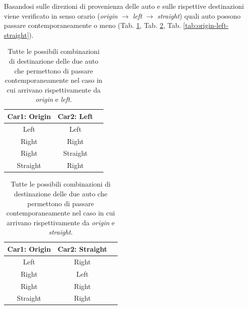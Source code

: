 Basandosi sulle direzioni di provenienza delle auto e sulle rispettive destinazioni viene verificato
in senso orario (\textit{origin} $\rightarrow$ \textit{left} $\rightarrow$ \textit{straight})
quali auto possono passare contemporaneamente o meno (Tab. \ref{tab:origin-left}, Tab. \ref{tab:origin-straight}, Tab. \ref{tab:origin-left-straight}).


\begin{table}[ht]
    \centering
    \begin{tabular}{|c|c|c|}
        \hline
        \textbf{Car1: Origin} & \textbf{Car2: Left} \\ \hline
        Left                  & Left                \\ \hline
        Right                 & Right               \\ \hline
        Right                 & Straight            \\ \hline
        Straight              & Right               \\ \hline
    \end{tabular}
    \caption{Tutte le possibili combinazioni di destinazione delle due auto che permettono
        di passare contemporaneamente nel caso in cui arrivano rispettivamente da \textit{origin} e \textit{left}.}
    \label{tab:origin-left}
\end{table}

\begin{table}[ht]
    \centering
    \begin{tabular}{|c|c|c|}
        \hline
        \textbf{Car1: Origin} & \textbf{Car2: Straight} \\ \hline
        Left                  & Right                   \\ \hline
        Right                 & Left                    \\ \hline
        Right                 & Right                   \\ \hline
        Straight              & Right                   \\ \hline
    \end{tabular}
    \caption{Tutte le possibili combinazioni di destinazione delle due auto che permettono
        di passare contemporaneamente nel caso in cui arrivano rispettivamente da \textit{origin} e \textit{straight}.}
    \label{tab:origin-straight}
\end{table}

